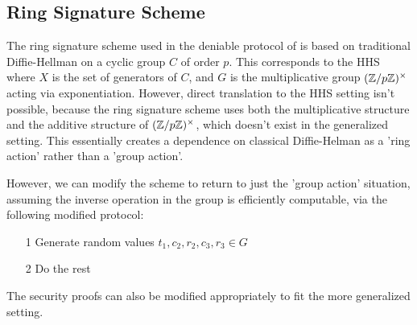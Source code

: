 \documentclass[11pt]{article}
\begin{document}
\subsection*{Ring Signature Scheme}

The ring signature scheme used in the deniable protocol of \cite{deniableAKE} is based on traditional Diffie-Hellman on a cyclic group $C$ of order $p$.
This corresponds to the HHS where $X$ is the set of generators of $C$, and $G$ is the multiplicative group $(\mathbb{Z}/p\mathbb{Z})^\times$ acting via exponentiation.
However, direct translation to the HHS setting isn't possible, because the ring signature scheme uses both the multiplicative structure and the additive structure of $(\mathbb{Z}/p\mathbb{Z})^\times$, which doesn't exist in the generalized setting.
This essentially creates a dependence on classical Diffie-Helman as a 'ring action' rather than a 'group action'.

However, we can modify the scheme to return to just the 'group action' situation, assuming the inverse operation in the group is efficiently computable, via the following modified protocol:

\begin{itemize}
\item[1] Generate random values $t_1, c_2, r_2, c_3, r_3 \in G$
\item [2] Do the rest
\end{itemize}

The security proofs can also be modified appropriately to fit the more generalized setting.


{}

\end{document}
